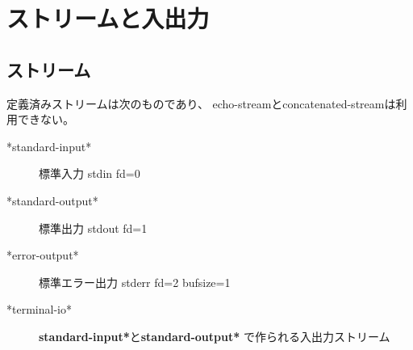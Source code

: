 \section{ストリームと入出力}

\subsection{ストリーム}

定義済みストリームは次のものであり、
echo-streamとconcatenated-streamは利用できない。

\begin{description}
\item[*standard-input*] 標準入力 stdin fd=0 
\item[*standard-output*] 標準出力 stdout fd=1 
\item[*error-output*] 標準エラー出力 stderr fd=2 bufsize=1
\item[*terminal-io*] {\bf *standard-input*}と{\bf *standard-output*}
で作られる入出力ストリーム
\end{description}

